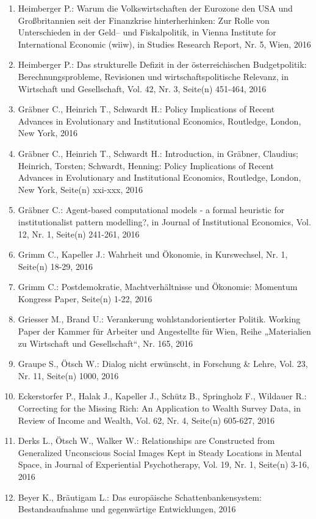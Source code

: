 \begin{enumerate}
	 \item Heimberger P.: Warum die Volkswirtschaften der Eurozone den USA und Großbritannien seit der Finanzkrise hinterherhinken: Zur Rolle von Unterschieden in der Geld– und Fiskalpolitik, in Vienna Institute for International Economic (wiiw), in Studies Research Report, Nr. 5, Wien, 2016
	 \item Heimberger P.: Das \glqq strukturelle Defizit\grqq{} in der österreichischen Budgetpolitik: Berechnungsprobleme, Revisionen und wirtschaftspolitische Relevanz, in Wirtschaft und Gesellschaft, Vol. 42, Nr. 3, Seite(n) 451-464, 2016
	 \item Gräbner C., Heinrich T., Schwardt H.: Policy Implications of Recent Advances in Evolutionary and Institutional Economics, Routledge, London, New York, 2016
	 \item Gräbner C., Heinrich T., Schwardt H.: Introduction, in Gräbner, Claudius; Heinrich, Torsten; Schwardt, Henning: Policy Implications of Recent Advances in Evolutionary and Institutional Economics, Routledge, London, New York, Seite(n) xxi-xxx, 2016
	 \item Gräbner C.: Agent-based computational models - a formal heuristic for institutionalist pattern modelling?, in Journal of Institutional Economics, Vol. 12, Nr. 1, Seite(n) 241-261, 2016
	 \item Grimm C., Kapeller J.: Wahrheit und Ökonomie, in Kurswechsel, Nr. 1, Seite(n) 18-29, 2016
	 \item Grimm C.: Postdemokratie, Machtverhältnisse und Ökonomie: Momentum Kongress Paper, Seite(n) 1-22, 2016
	 \item Griesser M., Brand U.: Verankerung wohlstandorientierter Politik. Working Paper der Kammer für Arbeiter und Angestellte für Wien, Reihe „Materialien zu Wirtschaft und Gesellschaft“, Nr. 165, 2016
	 \item Graupe S., Ötsch W.: Dialog nicht erwünscht, in Forschung \& Lehre, Vol. 23, Nr. 11, Seite(n) 1000, 2016
	 \item Eckerstorfer P., Halak J., Kapeller J., Schütz B., Springholz F., Wildauer R.: Correcting for the Missing Rich: An Application to Wealth Survey Data, in Review of Income and Wealth, Vol. 62, Nr. 4, Seite(n) 605-627, 2016
	 \item Derks L., Ötsch W., Walker W.: Relationships are Constructed from Generalized Unconscious Social Images Kept in Steady Locations in Mental Space, in Journal of Experiential Psychotherapy, Vol. 19, Nr. 1, Seite(n) 3-16, 2016
	 \item Beyer K., Bräutigam L.: Das europäische Schattenbankensystem: Bestandsaufnahme und gegenwärtige Entwicklungen, 2016

\end{enumerate}
